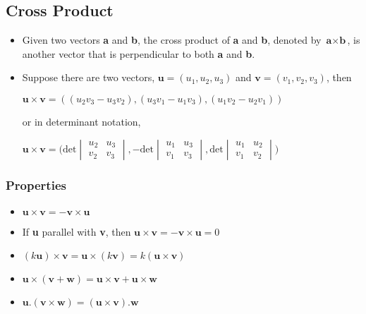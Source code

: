\documentclass[a4paper,12pt]{article}
\begin{document}
\subsection*{Cross Product}
\begin{itemize}
  \item Given two vectors \textbf{a} and \textbf{b}, the cross product of \textbf{a} and \textbf{b}, denoted by \(\textbf{a}\times\textbf{b}\), is another vector that is perpendicular to both \textbf{a} and \textbf{b}.
  \item Suppose there are two vectors, \(\textbf{u}=(u_1,u_2,u_3)\) and \(\textbf{v}=(v_1,v_2,v_3)\), then \begin{center}
          \(\textbf{u}\times\textbf{v}=((u_2v_3-u_3v_2), (u_3v_1-u_1v_3), (u_1v_2-u_2v_1))\)
        \end{center}
        or in determinant notation, \begin{center}
          \(\textbf{u}\times\textbf{v}=\Big(\text{det}\begin{vmatrix}
            u_2 & u_3 \\ v_2 & v_3
          \end{vmatrix}, -\text{det}\begin{vmatrix}
            u_1 & u_3 \\ v_1 & v_3
          \end{vmatrix}, \text{det}\begin{vmatrix}
            u_1 & u_2 \\ v_1 & v_2
          \end{vmatrix}\Big)\)
        \end{center}
\end{itemize}

\subsubsection*{Properties}
\begin{itemize}
  \item \(\textbf{u}\times\textbf{v}=-\textbf{v}\times\textbf{u}\)
  \item If \textbf{u} parallel with \textbf{v}, then \(\textbf{u}\times\textbf{v}=-\textbf{v}\times\textbf{u}=0\)
  \item \((k\textbf{u})\times\textbf{v}=\textbf{u}\times(k\textbf{v})=k(\textbf{u}\times\textbf{v})\)
  \item \(\textbf{u}\times(\textbf{v}+\textbf{w})=\textbf{u}\times\textbf{v}+\textbf{u}\times\textbf{w}\)
  \item \(\textbf{u}.(\textbf{v}\times\textbf{w})=(\textbf{u}\times\textbf{v}).\textbf{w}\)
\end{itemize}
\end{document}
